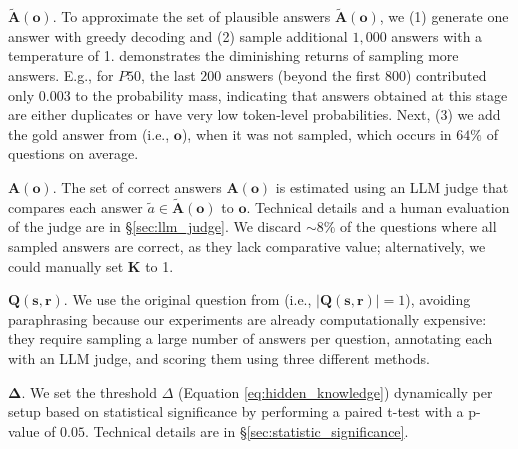 
$\mathbf{\tilde{A}(o)}.$
To approximate the set of plausible answers 
$\mathbf{\tilde{A}(o)}$, we (1) generate one answer with greedy decoding and (2) sample additional $1,000$ answers with a temperature of 1.  demonstrates the diminishing returns of sampling more answers. 
E.g., for $P50$, the last $200$ answers (beyond the first $800$) contributed only $0.003$ to the probability mass, indicating that answers obtained at this stage are either duplicates or have very low token-level probabilities. Next, (3) we add the gold answer from \eq (i.e., $\mathbf{o}$), when it was not sampled, which occurs in $64\%$ of questions on average. 

$\mathbf{A(o)}.$
The set of correct answers $\mathbf{A(o)}$ is estimated using an LLM judge that compares each answer $\tilde{a} \in \mathbf{\tilde{A}(o)}$ to $\mathbf{o}$. Technical details and a human evaluation of the judge are in \S \ref{sec:llm_judge}. We discard $\sim\!\!8\%$ of the questions where all sampled answers are correct, as they lack comparative value; alternatively, we could manually set $\mathbf{K}$ to 1.


$\mathbf{Q(s,r)}.$ We use the original question from \eq (i.e., $\mathbf{|Q(s,r)|}=1$), avoiding paraphrasing because our experiments are already computationally expensive: they require sampling a large number of answers per question, annotating each with an LLM judge, and scoring them using three different methods. 


$\boldsymbol{\Delta}.$ 
We set the threshold
$\Delta$ (Equation \ref{eq:hidden_knowledge}) dynamically per setup based on statistical significance by performing a paired t-test with a p-value of $0.05$.
Technical details are in \S \ref{sec:statistic_significance}.

